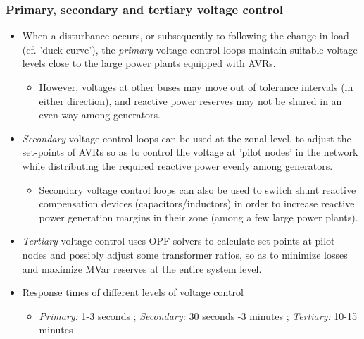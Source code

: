 \begin{frame}
    \frametitle{Primary, secondary and tertiary voltage control}
    \begin{itemize}
        \item When a disturbance occurs, or subsequently to following the change in load (cf. 'duck curve'), the \textit{primary} voltage control loops maintain suitable voltage levels close to the large power plants equipped with AVRs.
        \begin{itemize}
            \item However, voltages at other buses may move out of tolerance intervals (in either direction), and reactive power reserves may not be shared in an even way among generators.
        \end{itemize}
        \item \textit{Secondary} voltage control loops can be used at the zonal level, to adjust the set-points of AVRs so as to control the voltage at 'pilot nodes' in the network while distributing the required reactive power evenly among generators.
        \begin{itemize}
            \item Secondary voltage control loops can also be used to switch shunt reactive compensation devices (capacitors/inductors) in order to increase reactive power generation margins in their zone (among a few large power plants).
        \end{itemize}
        \item \textit{Tertiary} voltage control uses OPF solvers to calculate set-points at pilot nodes and possibly adjust some transformer ratios, so as to minimize losses and maximize MVar reserves at the entire system level.
        \item Response times of different levels of voltage control
        \begin{itemize}
            \item \textit{Primary:} 1-3 seconds ; \textit{Secondary:} 30 seconds -3 minutes ; \textit{Tertiary:} 10-15 minutes
        \end{itemize}
    \end{itemize}
\end{frame}

